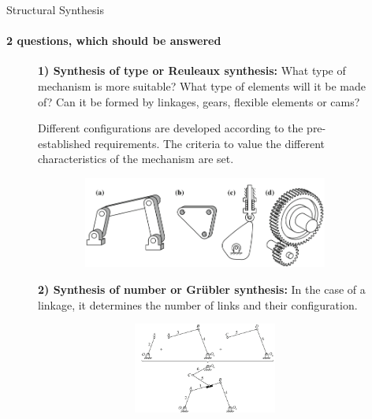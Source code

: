 \documentclass[aspectratio=169]{beamer}
\begin{document}
\begin{frame}[t]{Structural Synthesis}
\framesubtitle{2 questions, which should be answered}
\vspace{-0.6cm}
\begin{figure}[H]
    \begin{minipage}{0.50\textwidth}
        \footnotesize
        \textbf{1) Synthesis of type or Reuleaux synthesis:} What type of mechanism is more suitable? What type of elements will it be made of? Can it be formed by linkages, gears, ﬂexible elements or cams?
        
        Different conﬁgurations are developed according to the pre-established requirements. The criteria to value the different characteristics of the mechanism are set.
        \label{reuleaux_synthesis.png}
    \end{minipage}\hfill
    \begin{minipage}{0.48\textwidth}
        \centering\includegraphics[height=3cm,width=1\textwidth,keepaspectratio]{reuleaux_synthesis.png}
    \end{minipage}
\end{figure}
\vspace{-0.6cm}

\begin{figure}[H]
    \begin{minipage}{0.50\textwidth}
        \footnotesize
        \textbf{2) Synthesis of number or Grübler synthesis:} In the case of a linkage, it determines the number of links and their conﬁguration. 
        \label{grubler_synthesis.png}
    \end{minipage}\hfill
    \begin{minipage}{0.48\textwidth}
        \centering\includegraphics[height=3cm,width=1\textwidth,keepaspectratio]{grubler_synthesis.png}
    \end{minipage}
\end{figure}
\end{frame}
\end{document}
